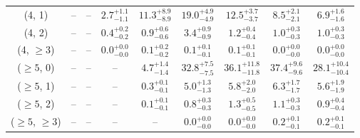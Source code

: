 \begin{table}[h!]
{\begin{tabular}{ccccccccc}
	(4, 1) & -- & -- & $2.7^{+ 1.1 }_{- 1.1 }$ & $11.3^{+ 8.9 }_{- 8.9 }$ & $19.0^{+ 4.9 }_{- 4.9 }$ & $12.5^{+ 3.7 }_{- 3.7 }$ & $8.5^{+ 2.1 }_{- 2.1 }$ & $6.9^{+ 1.6 }_{- 1.6 }$ \\[0.5ex] 
	(4, 2) & -- & -- & $0.4^{+ 0.2 }_{- 0.2 }$ & $0.9^{+ 0.6 }_{- 0.6 }$ & $3.4^{+ 0.9 }_{- 0.9 }$ & $1.2^{+ 0.4 }_{- 0.4 }$ & $1.0^{+ 0.3 }_{- 0.3 }$ & $1.0^{+ 0.3 }_{- 0.3 }$ \\[0.5ex] 
	(4, $\ge3$) & -- & -- & $0.0^{+ 0.0 }_{- 0.0 }$ & $0.1^{+ 0.2 }_{- 0.2 }$ & $0.1^{+ 0.1 }_{- 0.1 }$ & $0.1^{+ 0.1 }_{- 0.1 }$ & $0.0^{+ 0.0 }_{- 0.0 }$ & $0.0^{+ 0.0 }_{- 0.0 }$ \\[0.5ex] 
	($\ge5$, 0) & -- & -- & -- & $4.7^{+ 1.4 }_{- 1.4 }$ & $32.8^{+ 7.5 }_{- 7.5 }$ & $36.1^{+ 11.8 }_{- 11.8 }$ & $37.4^{+ 9.6 }_{- 9.6 }$ & $28.1^{+ 10.4 }_{- 10.4 }$ \\[0.5ex] 
	($\ge5$, 1) & -- & -- & -- & $0.3^{+ 0.1 }_{- 0.1 }$ & $5.0^{+ 1.3 }_{- 1.3 }$ & $5.8^{+ 2.0 }_{- 2.0 }$ & $6.3^{+ 1.7 }_{- 1.7 }$ & $5.6^{+ 1.9 }_{- 1.9 }$ \\[0.5ex] 
	($\ge5$, 2) & -- & -- & -- & $0.1^{+ 0.1 }_{- 0.1 }$ & $0.8^{+ 0.3 }_{- 0.3 }$ & $1.3^{+ 0.5 }_{- 0.5 }$ & $1.1^{+ 0.3 }_{- 0.3 }$ & $0.9^{+ 0.4 }_{- 0.4 }$ \\[0.5ex] 
	($\ge5$, $\ge3$) & -- & -- & -- & -- & $0.0^{+ 0.0 }_{- 0.0 }$ & $0.0^{+ 0.0 }_{- 0.0 }$ & $0.2^{+ 0.1 }_{- 0.1 }$ & $0.2^{+ 0.1 }_{- 0.1 }$ \\[0.5ex] 
	\hline
	\hline
\end{tabular}}
\end{table}
